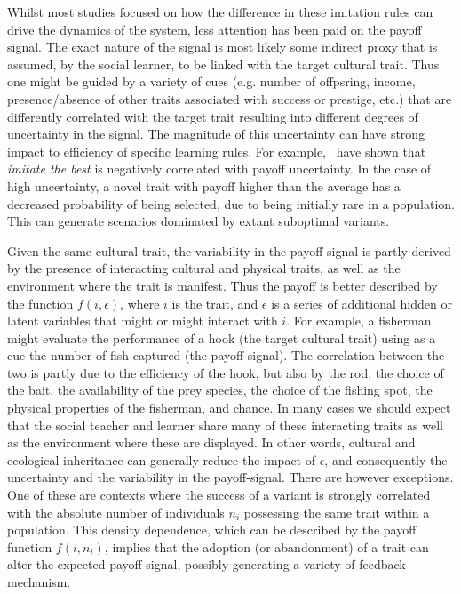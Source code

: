 \documentclass[3p,authoryear,twocolumn]{elsarticle} %
\begin{document}
Whilst most studies focused on how the difference in these imitation rules can drive the dynamics of the system, less attention has been paid on the payoff signal.  The exact nature of the signal is most likely some indirect proxy that is assumed, by the social learner, to be linked with the target cultural trait. Thus one might be guided by a variety of cues (e.g. number of offpsring, income, presence/absence of other traits associated with success or prestige, etc.) that are differently correlated with the target trait resulting into different degrees of uncertainty in the signal. The magnitude of this uncertainty can have strong impact to efficiency of specific learning rules. For example,~\citet{crema_lake_inpress} have shown that \emph{imitate the best} is negatively correlated with payoff uncertainty. In the case of high uncertainty, a novel trait with payoff higher than the average has a decreased probability of being selected, due to being initially rare in a population. This can generate scenarios dominated by extant suboptimal variants.

Given the same cultural trait, the variability in the payoff signal is partly derived by the presence of interacting cultural and physical traits, as well as the environment where the trait is manifest. Thus the payoff is better described by the function $f(i,\epsilon)$, where $i$ is the trait, and $\epsilon$ is a series of additional hidden or latent variables that might or might interact with $i$. For example, a fisherman might evaluate the performance of a hook (the target cultural trait) using as a cue the number of fish captured (the payoff signal). The correlation between the two is partly due to the efficiency of the hook, but also by the rod, the choice of the bait, the availability of the prey species, the choice of the fishing spot, the physical properties of the fisherman, and chance. In many cases we should expect that the social teacher and learner share many of these interacting traits as well as the environment where these are displayed. In other words, cultural and ecological inheritance can generally reduce the impact of $\epsilon$, and consequently the uncertainty and the variability in the payoff-signal. There are however exceptions. One of these are contexts where the success of a variant is strongly correlated with the absolute number of individuals $n_i$ possessing the same trait within a population. This density dependence, which can be described by the payoff function $f(i,n_i)$, implies that the adoption (or abandonment) of a trait can alter the expected payoff-signal, possibly generating a variety of feedback mechanism.  
\end{document}

